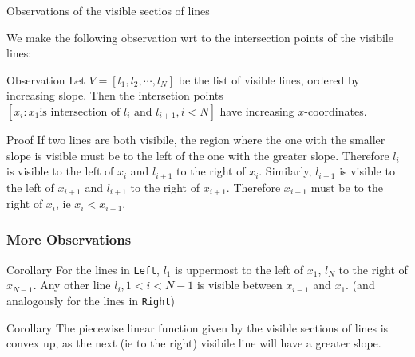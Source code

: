 \documentclass[ignorenonframetext,]{beamer}
\begin{document}
\begin{frame}{Observations of the visible sectios of lines}
  
  We make the following observation wrt to the intersection points of
  the visibile lines:

  \begin{block}{Observation}
    Let $V = [l_1, l_2, \cdots, l_N]$ be the list of visible lines, ordered by increasing slope. 
    Then the intersetion points $[x_i:  x_1 \text{is intersection of
      $l_i$ and $l_{i+1}, i < N$}]$ have increasing $x$-coordinates.
  \end{block}

  \begin{block}{Proof}
    If two lines are both visibile, the region where the one with the
    smaller slope is visible must be to the left of the one with the greater
    slope. Therefore $l_i$ is visible to the left of $x_i$ and
    $l_{i+1}$ to the right of $x_i$. Similarly, $l_{i+1}$ is visible
    to the left of $x_{i+1}$ and $l_{i+1}$ to the right of
    $x_{i+1}$. Therefore $x_{i+1}$ must be to the right of $x_i$, ie
    $x_i < x_{i+1}$.
  \end{block}
\end{frame}
\begin{frame}
  \frametitle{More Observations}
  \begin{block}{Corollary}
    For the lines in \texttt{Left}, $l_1$ is uppermost to the left of $x_1$, $l_N$ to the right of
    $x_{N-1}$. Any other line $l_i, 1 < i < N-1$ is visible between
    $x_{i-1}$ and $x_1$. (and analogously for the lines in \texttt{Right})
  \end{block}

  \begin{block}{Corollary}
    The piecewise linear function given by the visible sections of
    lines is convex up, as the next (ie to the right) visibile line
    will have a greater slope. 
  \end{block}
\end{frame}
\end{document}
